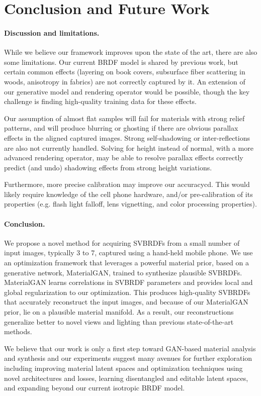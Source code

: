 \section{Conclusion and Future Work}
\label{sec:conclusion}
%
\paragraph{Discussion and limitations.}
While we believe our framework improves upon the state of the art, there are also some limitations. Our current BRDF model is shared by previous work, but certain common effects (layering on book covers, subsurface fiber scattering in woods, anisotropy in fabrics) are not correctly captured by it. An extension of our generative model and rendering operator would be possible, though the key challenge is finding high-quality  training data for these effects.

Our assumption of almost flat samples will fail for materials with strong relief patterns, and will produce blurring or ghosting if there are obvious parallax effects in the aligned captured images. Strong self-shadowing or inter-reflections are also not currently handled. Solving for height instead of normal, with a more advanced rendering operator, may be able to resolve parallax effects  correctly predict (and undo) shadowing effects from strong height variations.

Furthermore, more precise calibration may improve our accuracycd. This would likely require knowledge of the cell phone hardware, and/or pre-calibration of its properties (e.g. flash light falloff, lens vignetting, and color processing properties).


\paragraph{Conclusion.}
We propose a novel method for acquiring SVBRDFs from a small number of input images, typically 3 to 7, captured using a hand-held mobile phone.
We use an optimization framework that leverages a powerful material prior, based on a generative network, MaterialGAN, trained to synthesize plausible SVBRDFs.
MaterialGAN learns correlations in SVBRDF parameters and provides local and global regularization to our optimization.
This produces high-quality SVBRDFs that accurately reconstruct the input images, and because of our MaterialGAN prior, lie on a plausible material manifold.
As a result, our reconstructions generalize better to novel views and lighting than previous state-of-the-art methods.

We believe that our work is only a first step toward GAN-based material analysis and synthesis and our experiments suggest many avenues for further exploration including improving material latent spaces and optimization techniques using novel architectures and losses, learning disentangled and editable latent spaces, and expanding beyond our current isotropic BRDF model.


